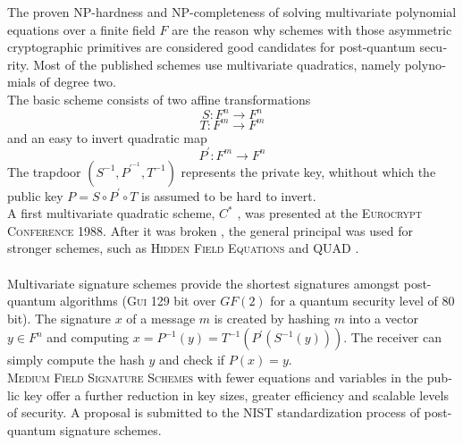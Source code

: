 \documentclass[a4paper,11pt]{article}
\begin{document}
\begin{otherlanguage}{english}
\begin{multicols}{2}
\noindent
The proven NP-hardness and NP-completeness of solving multivariate polynomial equations over a finite field $F$ are the reason why schemes with those asymmetric cryptographic primitives are considered good candidates for post-quantum security. Most of the published schemes use multivariate quadratics, namely polynomials of degree two. \\
The basic scheme consists of two affine transformations 
$$S: F^n \rightarrow F^n$$
$$T: F^m \rightarrow F^m$$
and an easy to invert quadratic map 
$$P^{\prime} : F^m \rightarrow F^n$$ 
\noindent
The trapdoor $(S^{-1}, P^{\prime^{-1}}, T^{-1})$ represents the private key, whithout which the public key $P = S \circ P^{\prime} \circ T$ is assumed to be hard to invert.\\ 
A first multivariate quadratic scheme, $C^*$ \cite{MI}, was presented at the \textsc{Eurocrypt Conference} 1988. After it was broken \cite{P95}, the general principal was used for stronger schemes, such as \textsc{Hidden Field Equations} \cite{HFE} and \textsc{QUAD} \cite{BGP}. \\
\\
Multivariate signature schemes provide the shortest signatures amongst post-quantum algorithms (\textsc{Gui} \cite{GUI} 129 bit over $GF(2)$ for a quantum security level of 80 bit). The signature $x$ of a message $m$ is created by hashing $m$ into a vector $y \in F^n$ and computing $x = P^{-1}(y) = T^{-1} (P^{\prime}(S^{-1}(y)))$. The receiver can simply compute the hash $y$ and check if $P(x) = y$. \\
\textsc{Medium Field Signature Schemes} \cite{HMFE} with fewer equations and variables in the public key offer  a further reduction in key sizes, greater efficiency and scalable levels of security. A proposal is submitted to the NIST standardization process of post-quantum signature schemes.


\end{multicols}
\end{otherlanguage}
\end{document}
